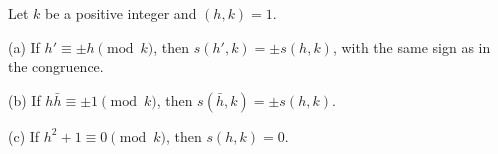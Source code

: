 Let $k$ be a positive integer and $(h, k) = 1$.

(a) If $h' \equiv \pm h \pmod{k}$, then $s(h', k) = \pm s(h, k)$, with the same sign as in the congruence.

(b) If $h\bar{h} \equiv \pm 1 \pmod{k}$, then $s(\bar{h}, k) = \pm s(h, k)$.

(c) If $h^2 + 1 \equiv 0 \pmod{k}$, then $s(h, k) = 0$.
